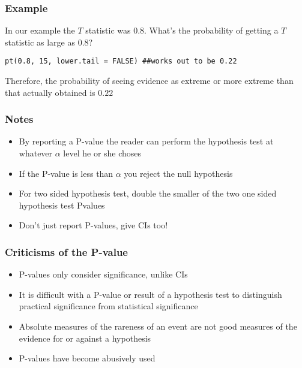 \documentclass[aspectratio=169]{beamer}
\begin{document}
\begin{frame}[fragile]\frametitle{Example} 
In our example the $T$ statistic was $0.8$. What's the probability of getting
a $T$ statistic as large as $0.8$?
\begin{verbatim}
pt(0.8, 15, lower.tail = FALSE) ##works out to be 0.22
\end{verbatim}
Therefore, the probability of seeing evidence as extreme or more
extreme than that actually obtained is $0.22$
\end{frame}

\begin{frame}\frametitle{Notes}
\begin{itemize}
\item By reporting a P-value the reader can perform the hypothesis
  test at whatever $\alpha$ level he or she choses
\item If the P-value is less than $\alpha$ you reject the null hypothesis 
\item For two sided hypothesis test, double the smaller of the two one
  sided hypothesis test Pvalues
\item Don't just report P-values, give CIs too!
\end{itemize}
\end{frame}

\begin{frame}\frametitle{Criticisms of the P-value}
\begin{itemize}
\item P-values only consider significance, unlike CIs
\item It is difficult with a P-value or result of a hypothesis test to
  distinguish practical significance from statistical significance
\item Absolute measures of the rareness of an event are not good
  measures of the evidence for or against a hypothesis
\item P-values have become abusively used
\end{itemize}
\end{frame}
\end{document}
